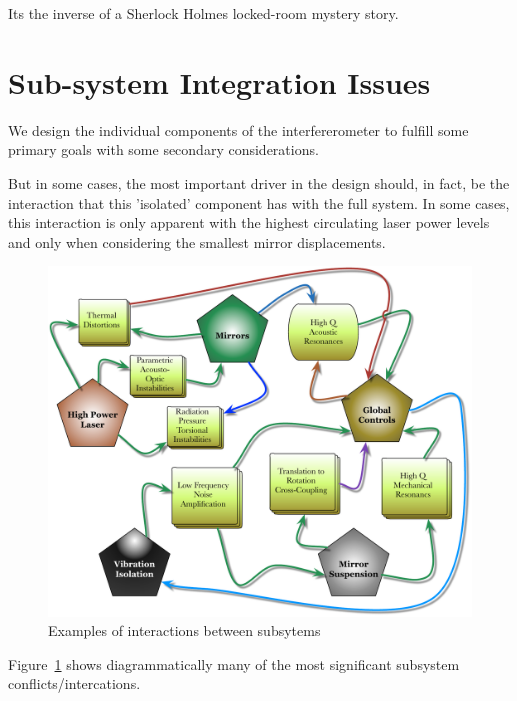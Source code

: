 Its the inverse of a Sherlock Holmes locked-room mystery story.


\section{Sub-system Integration Issues}
We design the individual components of the interfererometer to fulfill some
primary goals with some secondary considerations.

But in some cases, the most important driver in the design should, in fact, be the
interaction that this 'isolated' component has with the full system. In some cases,
this interaction is only apparent with the highest circulating laser power levels
and only when considering the smallest mirror displacements.


\begin{figure}[h]
\centering
\includegraphics[width=\columnwidth]{Figures/SystemConflicts.pdf}
\caption{Examples of interactions between subsytems}
\label{fig:SystemConflicts}
\end{figure}

Figure~\ref{fig:SystemConflicts} shows diagrammatically many of the most
significant subsystem conflicts/intercations.

